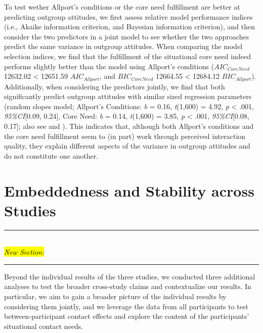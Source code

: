 To test wether Allport's conditions or the core need fulfillment are
better at predicting outgroup attitudes, we first assess relative model
performance indices (i.e., Akaike information criterion, and Bayesian
information criterion), and then consider the two predictors in a joint
model to see whether the two approaches predict the same variance in
outgroup attitudes. When comparing the model selection indices, we find
that the fulfillment of the situational core need indeed performs
slightly better than the model using Allport's conditions
(\(AIC_{CoreNeed}\) 12632.02 \textless{} 12651.59 \(AIC_{Allport}\), and
\(BIC_{CoreNeed}\) 12664.55 \textless{} 12684.12 \(BIC_{Allport}\)).
Additionally, when considering the predictors jointly, we find that both
significantly predict outgroup attitudes with similar sized regression
parameters (random slopes model; Allport's Conditions: \textit{b} =
0.16, \textit{t}(1,600) = 4.92, \textit{p} \textless{} .001,
\textit{95\%CI}{[}0.09, 0.24{]}, Core Need: \textit{b} = 0.14,
\textit{t}(1,600) = 3.85, \textit{p} \textless{} .001,
\textit{95\%CI}{[}0.08, 0.17{]}; also see
 and
). This indicates that, although both
Allport's conditions and the core need fulfillment seem to (in part)
work through perceived interaction quality, they explain different
aspects of the variance in outgroup attitudes and do not constitute one
another.

\section{Embeddedness and Stability across Studies}

\begin{center}
    \noindent\rule{8cm}{0.4pt}\\
    \hl{\textit{New Section:}}\\
    \vspace{-0.25cm}
    \noindent\rule{8cm}{0.4pt}
\end{center}

Beyond the individual results of the three studies, we conducted three
additional analyses to test the broader cross-study claims and
contextualize our results. In particular, we aim to gain a broader
picture of the individual results by considering them jointly, and we
leverage the data from all participants to test between-participant
contact effects and explore the content of the participants' situational
contact needs.

